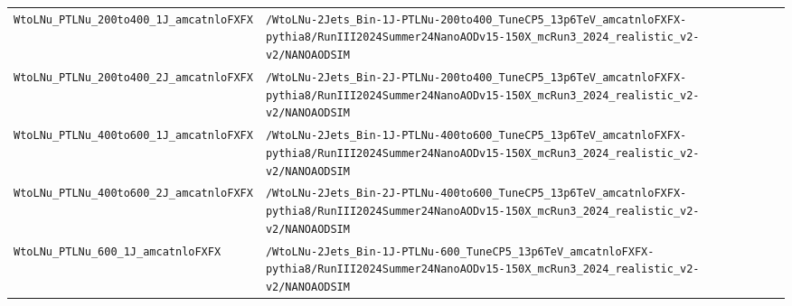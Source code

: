 \begin{longtable}{@{}>{\RaggedRight\arraybackslash}p{} >{\RaggedRight\arraybackslash}p{}@{}}
\addlinespace[2pt]
\texttt{WtoLNu\_\allowbreak{}PTLNu\_\allowbreak{}200to400\_\allowbreak{}1J\_\allowbreak{}amcatnloFXFX} & \texttt{/\allowbreak{}WtoLNu-\allowbreak{}2Jets\_\allowbreak{}Bin-\allowbreak{}1J-\allowbreak{}PTLNu-\allowbreak{}200to400\_\allowbreak{}TuneCP5\_\allowbreak{}13p6TeV\_\allowbreak{}amcatnloFXFX-\allowbreak{}pythia8/\allowbreak{}RunIII2024Summer24NanoAODv15-\allowbreak{}150X\_\allowbreak{}mcRun3\_\allowbreak{}2024\_\allowbreak{}realistic\_\allowbreak{}v2-\allowbreak{}v2/\allowbreak{}NANOAODSIM} \\
\addlinespace[2pt]
\texttt{WtoLNu\_\allowbreak{}PTLNu\_\allowbreak{}200to400\_\allowbreak{}2J\_\allowbreak{}amcatnloFXFX} & \texttt{/\allowbreak{}WtoLNu-\allowbreak{}2Jets\_\allowbreak{}Bin-\allowbreak{}2J-\allowbreak{}PTLNu-\allowbreak{}200to400\_\allowbreak{}TuneCP5\_\allowbreak{}13p6TeV\_\allowbreak{}amcatnloFXFX-\allowbreak{}pythia8/\allowbreak{}RunIII2024Summer24NanoAODv15-\allowbreak{}150X\_\allowbreak{}mcRun3\_\allowbreak{}2024\_\allowbreak{}realistic\_\allowbreak{}v2-\allowbreak{}v2/\allowbreak{}NANOAODSIM} \\
\addlinespace[2pt]
\texttt{WtoLNu\_\allowbreak{}PTLNu\_\allowbreak{}400to600\_\allowbreak{}1J\_\allowbreak{}amcatnloFXFX} & \texttt{/\allowbreak{}WtoLNu-\allowbreak{}2Jets\_\allowbreak{}Bin-\allowbreak{}1J-\allowbreak{}PTLNu-\allowbreak{}400to600\_\allowbreak{}TuneCP5\_\allowbreak{}13p6TeV\_\allowbreak{}amcatnloFXFX-\allowbreak{}pythia8/\allowbreak{}RunIII2024Summer24NanoAODv15-\allowbreak{}150X\_\allowbreak{}mcRun3\_\allowbreak{}2024\_\allowbreak{}realistic\_\allowbreak{}v2-\allowbreak{}v2/\allowbreak{}NANOAODSIM} \\
\addlinespace[2pt]
\texttt{WtoLNu\_\allowbreak{}PTLNu\_\allowbreak{}400to600\_\allowbreak{}2J\_\allowbreak{}amcatnloFXFX} & \texttt{/\allowbreak{}WtoLNu-\allowbreak{}2Jets\_\allowbreak{}Bin-\allowbreak{}2J-\allowbreak{}PTLNu-\allowbreak{}400to600\_\allowbreak{}TuneCP5\_\allowbreak{}13p6TeV\_\allowbreak{}amcatnloFXFX-\allowbreak{}pythia8/\allowbreak{}RunIII2024Summer24NanoAODv15-\allowbreak{}150X\_\allowbreak{}mcRun3\_\allowbreak{}2024\_\allowbreak{}realistic\_\allowbreak{}v2-\allowbreak{}v2/\allowbreak{}NANOAODSIM} \\
\addlinespace[2pt]
\texttt{WtoLNu\_\allowbreak{}PTLNu\_\allowbreak{}600\_\allowbreak{}1J\_\allowbreak{}amcatnloFXFX} & \texttt{/\allowbreak{}WtoLNu-\allowbreak{}2Jets\_\allowbreak{}Bin-\allowbreak{}1J-\allowbreak{}PTLNu-\allowbreak{}600\_\allowbreak{}TuneCP5\_\allowbreak{}13p6TeV\_\allowbreak{}amcatnloFXFX-\allowbreak{}pythia8/\allowbreak{}RunIII2024Summer24NanoAODv15-\allowbreak{}150X\_\allowbreak{}mcRun3\_\allowbreak{}2024\_\allowbreak{}realistic\_\allowbreak{}v2-\allowbreak{}v2/\allowbreak{}NANOAODSIM} \\

\end{longtable}
